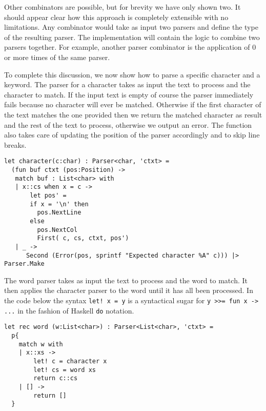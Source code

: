 \noindent
Other combinators are possible, but for brevity we have only shown two. It should appear clear how this approach is completely extensible with no limitations. Any combinator would take as input two parsers and define the type of the resulting parser. The implementation will contain the logic to combine two parsers together. For example, another parser combinator is the application of 0 or more times of the same parser.

To complete this discussion, we now show how to parse a specific character and a keyword. The parser for a character takes as input the text to process and the character to match. If the input text is empty of course the parser immediately fails because no character will ever be matched. Otherwise if the first character of the text matches the one provided then we return the matched character as result and the rest of the text to process, otherwise we output an error. The function also takes care of updating the position of the parser accordingly and to skip line breaks.

\begin{lstlisting}
let character(c:char) : Parser<char, 'ctxt> = 
  (fun buf ctxt (pos:Position) ->
   match buf : List<char> with
   | x::cs when x = c -> 
       let pos' = 
       if x = '\n' then 
         pos.NextLine 
       else 
         pos.NextCol
         First( c, cs, ctxt, pos')
   | _ -> 
      Second (Error(pos, sprintf "Expected character %A" c))) |> Parser.Make
\end{lstlisting}

\noindent
The word parser takes as input the text to process and the word to match. It then applies the character parser to the word until it has all been processed. In the code below the syntax \texttt{let! x = y} is a syntactical sugar for \texttt{y >>= fun x -> ...} in the fashion of Haskell \texttt{do} notation.

\begin{lstlisting}
let rec word (w:List<char>) : Parser<List<char>, 'ctxt> =
  p{
    match w with
    | x::xs ->
        let! c = character x
        let! cs = word xs
        return c::cs
    | [] -> 
        return []
  }
\end{lstlisting}

